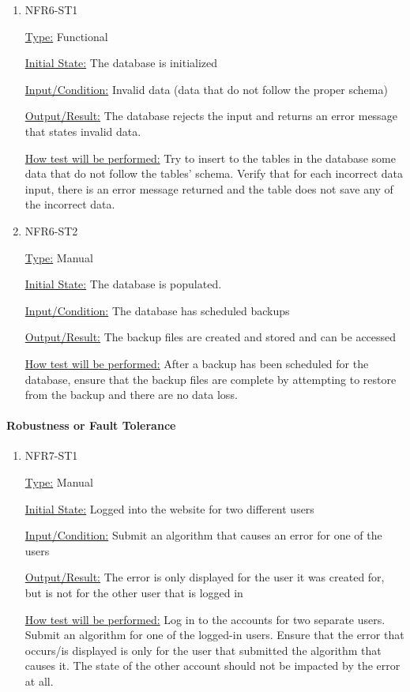 \documentclass[12pt, titlepage]{article}
\begin{document}
\begin{enumerate}

\item{NFR6-ST1\\}

\underline{Type:} Functional 

\underline{Initial State:} The database is initialized

\underline{Input/Condition:} Invalid data (data that do not follow the proper schema)  

\underline{Output/Result:} The database rejects the input and returns an error message that states invalid data.


\underline{How test will be performed:} 
Try to insert to the tables in the database some data that do not follow the tables’ schema. Verify that for each incorrect data input, there is an error message returned and the table does not save any of the incorrect data.

\item{NFR6-ST2\\}

\underline{Type:} Manual 

\underline{Initial State:} The database is populated.

\underline{Input/Condition:} The database has scheduled backups 

\underline{Output/Result:} The backup files are created and stored and can be accessed


\underline{How test will be performed:} After a backup has been scheduled for the database, ensure that the backup files are complete by attempting to restore from the backup and there are no data loss.


\end{enumerate}

\paragraph{Robustness or Fault Tolerance}

\begin{enumerate}

\item{NFR7-ST1\\}

\underline{Type:} Manual

\underline{Initial State:} Logged into the website for two different users

\underline{Input/Condition:} Submit an algorithm that causes an error for one of the users

\underline{Output/Result:} The error is only displayed for the user it was created for, but is not for the other user that is logged in

\underline{How test will be performed:} 
Log in to the accounts for two separate users. Submit an algorithm for one of the logged-in users. Ensure that the error that occurs/is displayed is only for the user that submitted the algorithm that causes it. The state of the other account should not be impacted by the error at all.

\end{enumerate}
\end{document}
